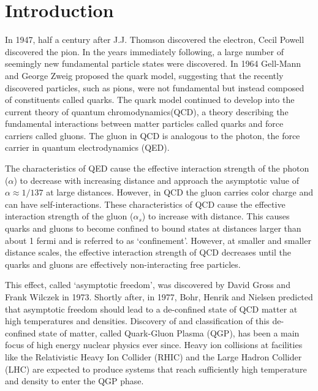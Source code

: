 \section{Introduction}
In 1947, half a century after J.J. Thomson discovered the electron, Cecil Powell discovered the pion\cite{}\cite{}. In the years immediately following, a large number of seemingly new fundamental particle states were discovered. In 1964 Gell-Mann and George Zweig proposed the quark model, suggesting that the recently discovered particles, such as pions, were not fundamental but instead composed of constituents called quarks\cite{}. The quark model continued to develop into the current theory of quantum chromodynamics(QCD), a theory describing the fundamental interactions between matter particles called quarks and force carriers called gluons. The gluon in QCD is analogous to the photon, the force carrier in quantum electrodynamics (QED). 

The characteristics of QED cause the effective interaction strength of the photon ($\alpha$) to decrease with increasing distance and approach the asymptotic value of $\alpha\approx1/137$ at large distances. However, in QCD the gluon carries color charge and can have self-interactions. These characteristics of QCD cause the effective interaction strength of the gluon ($\alpha_s$) to increase with distance. This causes quarks and gluons to become confined to bound states at distances larger than about 1 fermi and is referred to as `confinement'. However, at smaller and smaller distance scales, the effective interaction strength of QCD decreases until the quarks and gluons are effectively non-interacting free particles. 

This effect, called `asymptotic freedom', was discovered by David Gross and Frank Wilczek in 1973\cite{}. Shortly after, in 1977, Bohr, Henrik and Nielsen predicted that asymptotic freedom should lead to a de-confined state of QCD matter at high temperatures and densities\cite{}. Discovery of and classification of this de-confined state of matter, called Quark-Gluon Plasma (QGP), has been a main focus of high energy nuclear physics ever since. Heavy ion collisions at facilities like the Relativistic Heavy Ion Collider (RHIC) and the Large Hadron Collider (LHC) are expected to produce systems that reach sufficiently high temperature and density to enter the QGP phase\cite{}.


